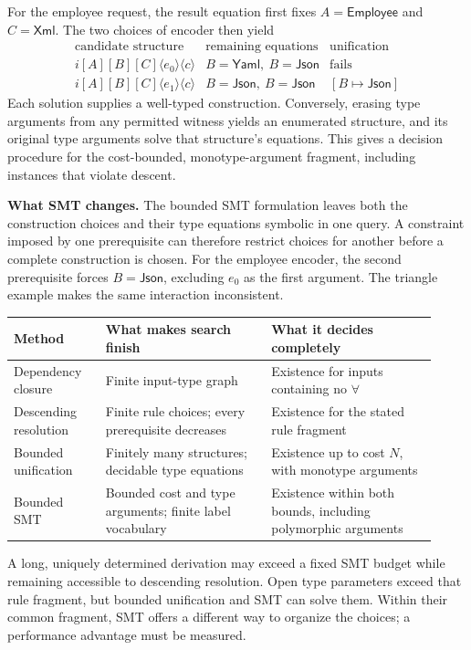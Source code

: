 \documentclass[10pt,a4paper]{article}
\newcommand{\iarg}[1]{\langle#1\rangle}
\newcommand{\kw}[1]{\mathsf{#1}}
\begin{document}
For the employee request, the result equation first fixes $A=\kw{Employee}$
and $C=\kw{Xml}$. The two choices of encoder then yield
\[
\begin{array}{c|c|c}
 \text{candidate structure} & \text{remaining equations} & \text{unification}\\ \hline
 i[A][B][C]\iarg{e_0}\iarg{c}
   & B=\kw{Yaml},\ B=\kw{Json} & \text{fails}\\
 i[A][B][C]\iarg{e_1}\iarg{c}
   & B=\kw{Json},\ B=\kw{Json} & [B\mapsto\kw{Json}]
\end{array}
\]
Each solution supplies a well-typed construction. Conversely, erasing type arguments
from any permitted witness yields an enumerated structure, and its original type
arguments solve that structure's equations. This gives a decision procedure for
the cost-bounded, monotype-argument fragment, including instances that violate descent.

\textbf{What SMT changes.}
The bounded SMT formulation leaves both the construction choices and their type
equations symbolic in one query. A constraint imposed by one prerequisite can
therefore restrict choices for another before a complete construction is chosen.
For the employee encoder, the second prerequisite forces $B=\kw{Json}$, excluding $e_0$ as the
first argument. The triangle example makes the same interaction inconsistent.

\begin{center}
\begin{tabular}{@{}p{0.20\linewidth}p{0.36\linewidth}p{0.36\linewidth}@{}}
\toprule
Method & What makes search finish & What it decides completely\\
\midrule
Dependency closure
  & Finite input-type graph
  & Existence for inputs containing no $\forall$\\[4pt]
Descending resolution
  & Finite rule choices; every prerequisite decreases
  & Existence for the stated rule fragment\\[4pt]
Bounded unification
  & Finitely many structures; decidable type equations
  & Existence up to cost $N$, with monotype arguments\\[4pt]
Bounded SMT
  & Bounded cost and type arguments; finite label vocabulary
  & Existence within both bounds, including polymorphic arguments\\
\bottomrule
\end{tabular}
\end{center}
A long, uniquely determined derivation may exceed a fixed SMT budget while remaining
accessible to descending resolution. Open type parameters exceed that rule fragment,
but bounded unification and SMT can solve them.
Within their common fragment, SMT offers a different way to organize the choices;
a performance advantage must be measured.
\end{document}
